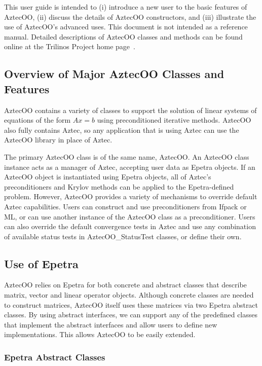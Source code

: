 \documentclass[12pt,relax]{AztecOOUserGuide}
\newcommand{\statustest}{AztecOO\_StatusTest}
\begin{document}
This user guide is intended to (i) introduce a new
user to the basic features of AztecOO, (ii) discuss the details of AztecOO
constructors, and (iii) illustrate the use of
AztecOO's advanced uses.  This document is not intended as a reference
manual.  Detailed descriptions of AztecOO classes and methods can be
found online at the Trilinos Project home page~\cite{Trilinos-home-page}.


\subsection{Overview of Major AztecOO Classes and Features}

AztecOO contains a variety of classes to support the solution of
linear systems of equations of the form $Ax=b$ using preconditioned
iterative methods.  AztecOO also fully contains Aztec, so any application
that is using Aztec can use the AztecOO library in place of Aztec.  

The primary AztecOO class is of the same name, AztecOO.  An AztecOO
class instance acts as a manager of Aztec, accepting user data as
Epetra objects.  If an AztecOO object is instantiated using Epetra
objects, all of Aztec's preconditioners and Krylov methods can be
applied to the Epetra-defined problem.  However, AztecOO provides a
variety of mechanisms to override default Aztec capabilities.  Users
can construct and use preconditioners from Ifpack or ML, or can use
another instance of the AztecOO class as a preconditioner.  Users can
also override the default convergence tests in Aztec and use any
combination of available status tests in \statustest{} classes,
or define their own.

\subsection{Use of Epetra}

AztecOO relies on Epetra for both concrete and abstract classes that
describe matrix, vector and linear operator objects.  
Although  concrete classes are needed to construct matrices, AztecOO
itself uses these matrices via two Epetra abstract classes.  By using
abstract interfaces, we can support any of the predefined classes that
implement the abstract interfaces and allow users to define
new implementations.  This allows AztecOO
to be easily extended.  

\subsubsection{Epetra Abstract Classes}
\end{document}
